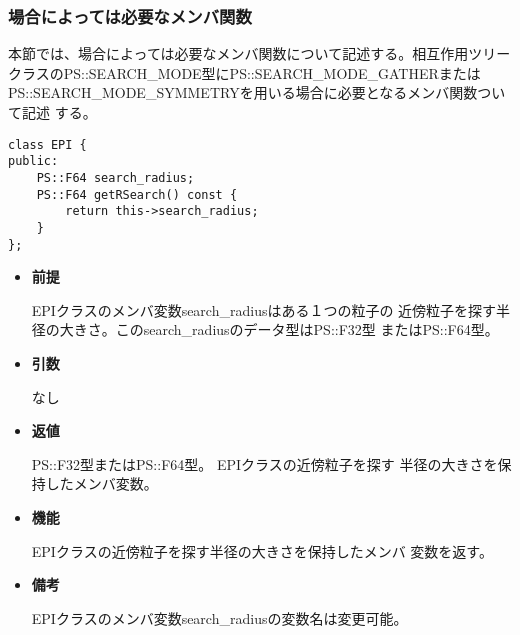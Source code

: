 \subsubsection{場合によっては必要なメンバ関数}


本節では、場合によっては必要なメンバ関数について記述する。相互作用ツリー
クラスのPS::SEARCH\_MODE型にPS::SEARCH\_MODE\_GATHERまたは
PS::SEARCH\_MODE\_SYMMETRYを用いる場合に必要となるメンバ関数ついて記述
する。



\begin{screen}
\begin{verbatim}
class EPI {
public:
    PS::F64 search_radius;
    PS::F64 getRSearch() const {
        return this->search_radius;
    }
};
\end{verbatim}
\end{screen}

\begin{itemize}

\item {\bf 前提}

  EPIクラスのメンバ変数search\_radiusはある１つの粒子の
  近傍粒子を探す半径の大きさ。このsearch\_radiusのデータ型はPS::F32型
  またはPS::F64型。
  
\item {\bf 引数}

  なし
  
\item {\bf 返値}

  PS::F32型またはPS::F64型。 EPIクラスの近傍粒子を探す
  半径の大きさを保持したメンバ変数。
  
\item {\bf 機能}

  EPIクラスの近傍粒子を探す半径の大きさを保持したメンバ
  変数を返す。

\item {\bf 備考}

  EPIクラスのメンバ変数search\_radiusの変数名は変更可能。
  
\end{itemize}
\fi

